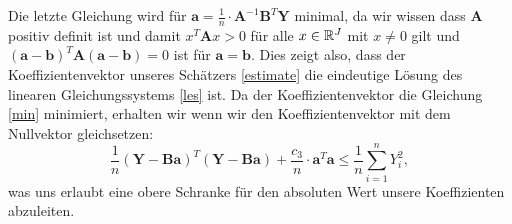 Die letzte Gleichung wird für $\mathbf{a} = \frac{1}{n} \cdot \mathbf{A}^{-1}\mathbf{B}^T\mathbf{Y}$ minimal, 
da wir wissen dass $\mathbf{A}$ positiv definit ist und damit $x^T\mathbf{A}x > 0$ für alle $x \in \mathbb{R}^J$ mit $x \neq 0$ gilt und $(\mathbf{a} - \mathbf{b})^T\mathbf{A}(\mathbf{a} - \mathbf{b}) = 0$ ist für $\mathbf{a} = \mathbf{b}$. Dies zeigt also, dass der Koeffizientenvektor unseres Schätzers \ref{estimate} die eindeutige Lösung des linearen Gleichungssystems \ref{les} ist.
Da der Koeffizientenvektor die Gleichung \ref{min} minimiert, erhalten wir wenn wir den Koeffizientenvektor mit dem Nullvektor gleichsetzen$\colon$
$$\frac{1}{n}(\mathbf{Y} - \mathbf{B}\mathbf{a})^T(\mathbf{Y} - \mathbf{B}\mathbf{a}) + \frac{c_3}{n} \cdot \mathbf{a}^T\mathbf{a} \leq \frac{1}{n} \sum_{i = 1}^n Y_i^2,$$
was uns erlaubt eine obere Schranke für den absoluten Wert unsere Koeffizienten abzuleiten.


